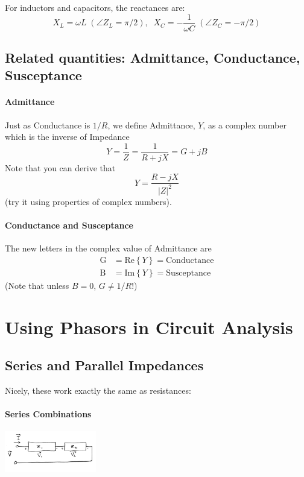 For inductors and
capacitors, the reactances are:
\[
X_L = \omega L\;(\angle{Z_L} = \pi/2),\;\; X_C = -\frac {1}  {\omega C}\; (\angle{Z_C} = -\pi/2)
\]

\subsection{Related quantities: Admittance, Conductance, Susceptance}

\paragraph{Admittance}
Just as Conductance is $1/R$, we define Admittance, $Y$, as a complex number
which is the inverse of Impedance
\[
Y = \frac {1}  {Z} = \frac{1}{R+jX} = G+jB
\]
Note that you can derive that
\[
Y = \frac {R-jX}  {|Z|^2}
\]
(try it using properties of complex numbers).


\paragraph{Conductance and Susceptance}

The new letters in the complex value of Admittance are
\begin{align}
\mathrm{G} &= \mathrm{Re}\left \{ Y \right \} = \mathrm{Conductance}\\
\mathrm{B} &= \mathrm{Im}\left \{ Y \right \} = \mathrm{Susceptance}
\end{align}
(Note that unless $B=0$, $G \neq 1/R$!)


\subsection{}






\section{Using Phasors in Circuit Analysis }




\subsection{Series and Parallel Impedances}

Nicely, these work exactly the same as resistances:

\paragraph{Series Combinations}
\includegraphics[width=0.3\textwidth]{figsChapt02/FT71566.png}

